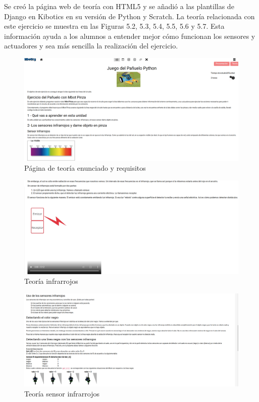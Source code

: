 Se creó la página web de teoría con HTML5  y se añadió a las plantillas de Django en Kibotics en su versión de Python y Scratch. La teoría relacionada con este ejercicio se muestra en las Figuras 5.2, 5.3, 5.4, 5.5, 5.6 y 5.7. Esta información ayuda a  los alumnos a entender mejor cómo funcionan los sensores y actuadores y sea más sencilla la realización del ejercicio.

\begin{figure}[H]
    \centering
    \includegraphics[width=1\textwidth, height=0.45\textwidth]{chapters/images/teoriag1.png}
    \caption{Página de teoría enunciado y requisitos}
    \label{fig:my_label}
\end{figure}
\begin{figure}[H]
    \centering
    \includegraphics[width=1\textwidth, height=0.4\textwidth]{chapters/images/teoriag2.png}
    \caption{Teoría infrarrojos}
    \label{fig:my_label}
\end{figure}
\begin{figure}[H]
    \centering
    \includegraphics[width=1\textwidth, height=0.4\textwidth]{chapters/images/teoriag3.png}
    \caption{Teoría sensor infrarrojos}
    \label{fig:my_label}
\end{figure}


